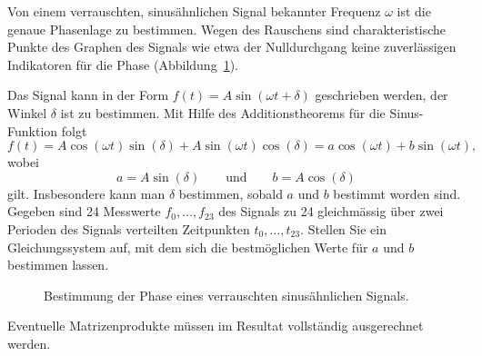 Von einem verrauschten, sinusähnlichen Signal bekannter Frequenz $\omega$
ist die genaue Phasenlage zu bestimmen.
Wegen des Rauschens sind charakteristische Punkte des Graphen des Signals
wie etwa der Nulldurchgang keine zuverlässigen Indikatoren für die Phase
(Abbildung~\ref{60000022:figure}).

Das Signal kann in der Form $f(t) = A\sin(\omega t + \delta)$ geschrieben
werden, der Winkel $\delta$ ist zu bestimmen.
Mit Hilfe des Additionstheorems für die Sinus-Funktion folgt
\[
f(t) = A\cos(\omega t)\sin(\delta) + A \sin(\omega t)\cos(\delta)
=
a\cos(\omega t) + b \sin(\omega t),
\]
wobei
\[
a = A\sin(\delta)
\qquad\text{und}\qquad
b = A\cos(\delta)
\]
gilt.
Insbesondere kann man $\delta$ bestimmen, sobald $a$ und $b$ bestimmt
worden sind.
Gegeben sind 24 Messwerte $f_0,\dots,f_{23}$ des Signals zu 24 gleichmässig
über zwei Perioden des Signals verteilten Zeitpunkten $t_0,\dots,t_{23}$.
Stellen Sie ein Gleichungssystem auf, mit dem sich die bestmöglichen Werte
für $a$ und $b$ bestimmen lassen.

\begin{figure}[h]
\centering
{}
\caption{Bestimmung der Phase eines verrauschten sinusähnlichen Signals.
\label{60000022:figure}}
\end{figure}

\begin{hinweis}
Eventuelle Matrizenprodukte müssen im Resultat vollständig ausgerechnet
werden.
\end{hinweis}

